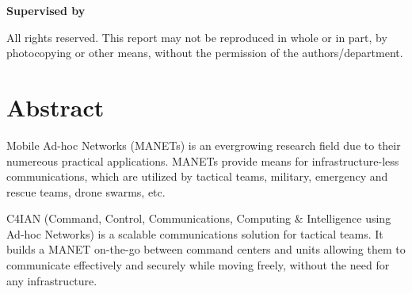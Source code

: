{\begin{center}
    \vspace{15pt}
    {\Large \textbf{Supervised by}}\\
    \vspace{5pt}
    \textbf{\gpSupervisor}
    
    \vspace{15pt}
    \textbf{\gpDate{}}
    
    \vspace{30pt}
    All rights reserved. This report may not be reproduced in whole or in part, by photocopying or other means, without the permission of the authors/department.    
\end{center}
\newpage
}

\section*{Abstract}
\label{sec:abstract}

    
Mobile Ad-hoc Networks (MANETs) is an evergrowing research field due to their numereous practical applications. MANETs provide means for infrastructure-less communications, which are utilized by tactical teams, military, emergency and rescue teams, drone swarms, etc.

C4IAN (Command, Control, Communications, Computing \& Intelligence using Ad-hoc Networks) is a scalable communications solution for tactical teams. It builds a MANET on-the-go between command centers and units allowing them to communicate effectively and securely while moving freely, without the need for any infrastructure.


